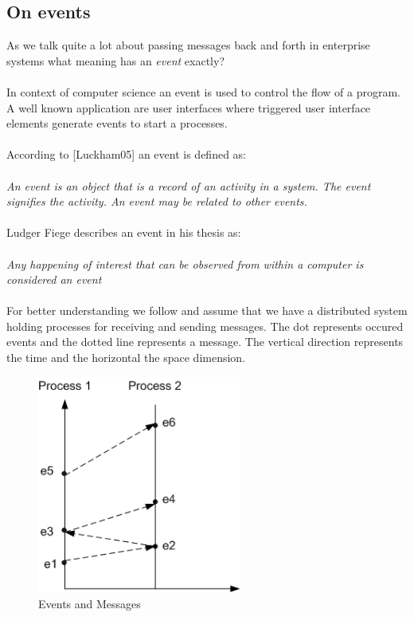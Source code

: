 \documentclass[a4paper,titlepage,11pt,DIV10,BCOR0.5cm,headinclude]{article}
\begin{document}
\subsection{On events}
As we talk quite a lot about passing messages back and forth in enterprise systems what meaning has an \textit{event} exactly? 
\\\\
In context of computer science an event is used to control the flow of a program. A well known application are user interfaces where triggered user interface elements generate events to start a processes.
\\\\
According to [Luckham05] an event is defined as:
\\\\
\textit{An event is an object that is a record of an activity in a system. The event signifies the activity. An event may be related to other events.}
\\\\
Ludger Fiege describes an event in his thesis as:
\\\\
\textit{Any happening of interest that can be observed from within a computer is considered an event}\cite{LudgerFiege05}
\\\\
For better understanding we follow \cite{Lamport78} and assume that we have a distributed system holding processes for receiving and sending messages. The dot represents occured events and the dotted line represents a message. The vertical direction represents the time and the horizontal the space dimension.
\begin{figure}                         
	\centering                                           
	\includegraphics[width=0.6\textwidth]{pics/lamportEvent.jpg}
	\caption{Events and Messages}             
	\label{fig:LamportEvent}
\end{figure}  
\end{document}
